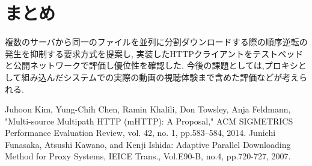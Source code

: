 \documentclass{ltjsarticle}
\begin{document}
\section{まとめ}
\vspace{-2mm}
複数のサーバから同一のファイルを並列に分割ダウンロードする際の順序逆転の発生を抑制する要求方式を提案し,
実装したHTTPクライアントをテストベッドと公開ネットワークで評価し優位性を確認した.
今後の課題としては,プロキシとして組み込んだシステムでの実際の動画の視聴体験まで含めた評価などが考えられる.
\vspace{-8mm}
\small
\begin{thebibliography}{2}
\vspace{-2mm}
\small{
Juhoon Kim, Yung-Chih Chen, Ramin Khalili, Don Towsley, Anja Feldmann,
"Multi-source Multipath HTTP (mHTTP): A Proposal,"
ACM SIGMETRICS Performance Evaluation Review, vol. 42, no. 1, pp.583--584, 2014.
\small
Junichi Funasaka, Atsushi Kawano, and Kenji Ishida: Adaptive Parallel Downloading Method for Proxy Systems, IEICE Trans., Vol.E90-B, no.4, pp.720-727, 2007.}
\end{thebibliography}
\end{document}
